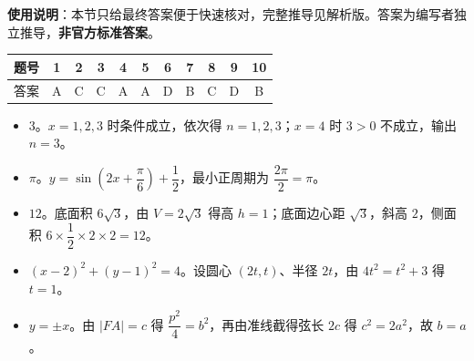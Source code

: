 
\begin{gknotice}
\textbf{使用说明}：本节只给最终答案便于快速核对，完整推导见解析版。答案为编写者独立推导，\textbf{非官方标准答案}。
\end{gknotice}

\begin{center}\begin{tabular}{ccccccccccc}
\toprule
题号 & 1 & 2 & 3 & 4 & 5 & 6 & 7 & 8 & 9 & 10 \\
\midrule
答案 & A & C & C & A & A & D & B & C & D & B \\
\bottomrule
\end{tabular}\end{center}

\begin{itemize}[leftmargin=2.6em]
  \item[\textbf{11.}] $3$。$x=1,2,3$ 时条件成立，依次得 $n=1,2,3$；$x=4$ 时 $3>0$ 不成立，输出 $n=3$。
  \item[\textbf{12.}] $\pi$。$y=\sin\left(2x+\dfrac\pi6\right)+\dfrac12$，最小正周期为 $\dfrac{2\pi}2=\pi$。
  \item[\textbf{13.}] $12$。底面积 $6\sqrt3$，由 $V=2\sqrt3$ 得高 $h=1$；底面边心距 $\sqrt3$，斜高 $2$，侧面积 $6\times\dfrac12\times2\times2=12$。
  \item[\textbf{14.}] $(x-2)^2+(y-1)^2=4$。设圆心 $(2t,t)$、半径 $2t$，由 $4t^2=t^2+3$ 得 $t=1$。
  \item[\textbf{15.}] $y=\pm x$。由 $|FA|=c$ 得 $\dfrac{p^2}4=b^2$，再由准线截得弦长 $2c$ 得 $c^2=2a^2$，故 $b=a$。
\end{itemize}

